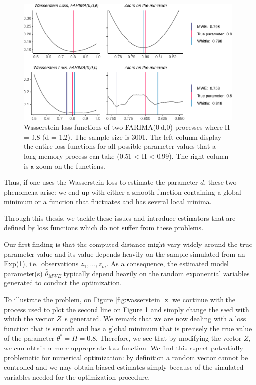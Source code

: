 \documentclass[
  11pt,
]{article}
\begin{document}
\begin{figure}

{\centering \includegraphics[width=0.6\linewidth]{Master_thesis_V3_files/figure-latex/wasserstein_farima-1} 

}

\caption{Wasserstein loss functions of two FARIMA(0,d,0) processes where H = 0.8 (d = 1.2). The sample size is 3001. The left column display the entire loss functions for all possible parameter values that a long-memory process can take (0.51 < H < 0.99). The right column is a zoom on the functions.}\label{fig:wasserstein_farima}
\end{figure}

Thus, if one uses the Wasserstein loss to estimate the parameter \(d\),
these two phenomena arise: we end up with either a smooth function
containing a global minimum or a function that fluctuates and has
several local minima.

Through this thesis, we tackle these issues and introduce estimators
that are defined by loss functions which do not suffer from these
problems.

Our first finding is that the computed distance might vary widely around
the true parameter value and its value depends heavily on the sample
simulated from an Exp(1), i.e.~observations \(z_1, ..., z_m\). As a
consequence, the estimated model parameter(s) \(\hat \theta_{MWE}\)
typically depend heavily on the random exponential variables generated
to conduct the optimization.

To illustrate the problem, on Figure \ref{fig:wasserstein_z} we continue
with the process used to plot the second line on Figure
\ref{fig:wasserstein_farima} and simply change the seed with which the
vector \(Z\) is generated. We remark that we are now dealing with a loss
function that is smooth and has a global minimum that is precisely the
true value of the parameter \(\theta^* = H = 0.8\). Therefore, we see
that by modifying the vector \(Z\), we can obtain a more appropriate
loss function. We find this aspect potentially problematic for numerical
optimization: by definition a random vector cannot be controlled and we
may obtain biased estimates simply because of the simulated variables
needed for the optimization procedure.
\end{document}

